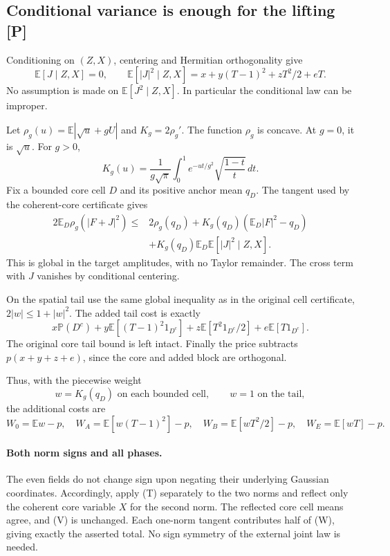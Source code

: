 \subsection{Conditional variance is enough for the lifting [P]}
Conditioning on \((Z,X)\), centering and Hermitian orthogonality give
\[
\mathbb E[J\mid Z,X]=0,\qquad
\mathbb E[|J|^2\mid Z,X]
=x+y(T-1)^2+zT^2/2+eT.
\tag{V}
\]
No assumption is made on \(\mathbb E[J^2\mid Z,X]\). In particular the
conditional law can be improper.

Let \(\rho_g(u)=\mathbb E|\sqrt u+gU|\) and \(K_g=2\rho_g'\).
The function \(\rho_g\) is concave. At \(g=0\), it is \(\sqrt u\).
For \(g>0\),
\[
K_g(u)=\frac1{g\sqrt\pi}\int_0^1
e^{-ut/g^2}\sqrt{\frac{1-t}{t}}\,dt.
\]
Fix a bounded core cell \(D\) and its positive anchor mean \(q_D\).
The tangent used by the coherent-core certificate gives
\[
\begin{split}
2\mathbb E_D\rho_g(|F+J|^2)
\le{}&2\rho_g(q_D)
+K_g(q_D)(\mathbb E_D|F|^2-q_D)\\
&+K_g(q_D)\mathbb E_D\mathbb E[|J|^2\mid Z,X].
\end{split}
\tag{T}
\]
This is global in the target amplitudes, with no Taylor remainder.
The cross term with \(J\) vanishes by conditional centering.

On the spatial tail use the same global inequality as in the original
cell certificate, \(2|w|\le1+|w|^2\). The added tail cost is exactly
\[
x\mathbb P(D^c)+y\mathbb E[(T-1)^2 1_{D^c}]
+z\mathbb E[T^2 1_{D^c}/2]+e\mathbb E[T1_{D^c}].
\]
The original core tail bound is left intact. Finally the price subtracts
\(p(x+y+z+e)\), since the core and added block are orthogonal.

Thus, with the piecewise weight
\[
w=K_g(q_D)\text{ on each bounded cell},\qquad w=1\text{ on the tail},
\]
the additional costs are
\[
W_0=\mathbb Ew-p,\quad W_A=\mathbb E[w(T-1)^2]-p,\quad
W_B=\mathbb E[wT^2/2]-p,\quad W_E=\mathbb E[wT]-p.
\tag{W}
\]

\paragraph{Both norm signs and all phases.}
The even fields do not change sign upon negating their underlying Gaussian
coordinates. Accordingly, apply (T) separately to the two norms and reflect
only the coherent core variable \(X\) for the second norm.
The reflected core cell means agree, and (V) is unchanged. Each one-norm
tangent contributes half of (W), giving exactly the asserted total.
No sign symmetry of the external joint law is needed.

